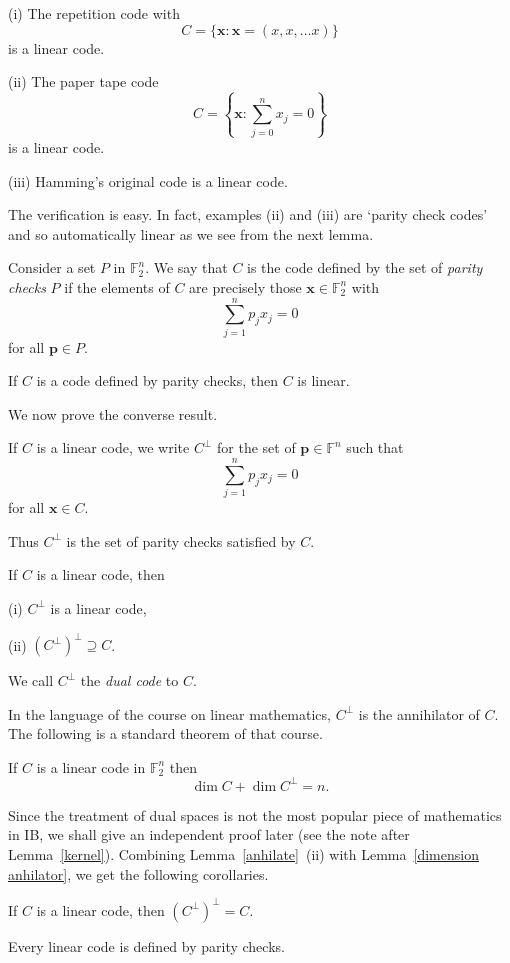 \begin{example}
(i) The repetition code with
\[C=\{{\mathbf x}:{\mathbf x}=(x,x,\dots x)\}\]
is a linear code.

(ii)  The paper tape code
\[C=\left\{{\mathbf x}:\sum_{j=0}^{n}x_{j}=0\right\}\]
is a linear code.

(iii) Hamming's original code is a linear code.
\end{example}
The verification is easy. In fact,
examples (ii) and (iii) are `parity check
codes' and so automatically linear
as we see from the next lemma.

\begin{definition} Consider a set $P$ in
${\mathbb F}_{2}^{n}$. We say that $C$
is the code defined by the set of
\emph{parity checks}  $P$ if
the elements of $C$ are precisely
those ${\mathbf x}\in{\mathbb F}_{2}^{n}$
with
\[\sum_{j=1}^{n}p_{j}x_{j}=0\]
for all ${\mathbf p}\in P$.
\end{definition}
\begin{lemma} If $C$ is a code defined
by parity checks, then $C$ is linear.
\end{lemma}

We now prove the converse result.
\begin{definition}
If  $C$ is a linear code, we write
$C^{\perp}$ for the set of  ${\mathbf p}\in{\mathbb F}^{n}$
such that
\[\sum_{j=1}^{n}p_{j}x_{j}=0\]
for all ${\mathbf x}\in C$.
\end{definition}
\noindent
Thus $C^{\perp}$ is the set of parity
checks satisfied by $C$.
\begin{lemma}\label{anhilate}
If $C$ is a linear code, then

(i) $C^{\perp}$ is a linear code,

(ii) $(C^{\perp})^{\perp}\supseteq C$.
\end{lemma}
\noindent
We call $C^{\perp}$ the \emph{dual code} to $C$.

In the language of
the course on linear mathematics,
$C^{\perp}$ is the annihilator of $C$.
The following is a standard theorem of
that course.
\begin{lemma}\label{dimension anhilator}
If  $C$ is a linear code in
${\mathbb F}_{2}^{n}$ then
\[\dim C+\dim C^{\perp}=n.\]
\end{lemma}
Since the treatment of dual spaces is not the most
popular piece of mathematics in IB, we
shall give an independent proof later
(see the note after Lemma~\ref{kernel}).
Combining Lemma~\ref{anhilate}~(ii)
with Lemma~\ref{dimension anhilator},
we get the following corollaries.
\begin{lemma} If $C$ is a linear code, then
$(C^{\perp})^{\perp}=C$.
\end{lemma}
\begin{lemma}\label{parity}
Every linear code is defined by parity
checks.
\end{lemma}


